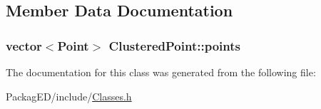 \subsection{Member Data Documentation}
\subsubsection[{\texorpdfstring{points}{points}}]{\setlength{\rightskip}{0pt plus 5cm}vector$<${\bf Point}$>$ Clustered\+Point\+::points}\hypertarget{class_clustered_point_af17b29f92f5822715da1e1947c0402a1}{}\label{class_clustered_point_af17b29f92f5822715da1e1947c0402a1}


The documentation for this class was generated from the following file\+:\begin{DoxyCompactItemize}
\item 
Packag\+E\+D/include/\hyperlink{_classes_8h}{Classes.\+h}\end{DoxyCompactItemize}
